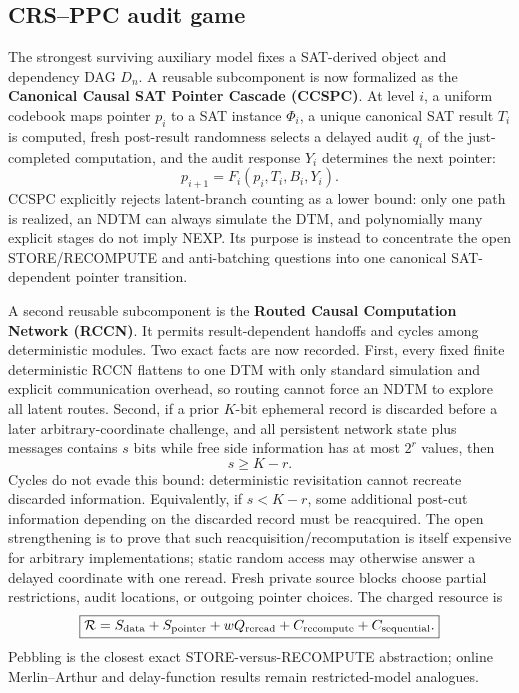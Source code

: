 \documentclass[11pt]{article}
\begin{document}
\subsection{CRS--PPC audit game}
The strongest surviving auxiliary model fixes a SAT-derived object and dependency DAG \(D_n\).
A reusable subcomponent is now formalized as the \textbf{Canonical Causal SAT Pointer Cascade
(CCSPC)}. At level \(i\), a uniform codebook maps pointer \(p_i\) to a SAT instance \(\Phi_i\),
a unique canonical SAT result \(T_i\) is computed, fresh post-result randomness selects a delayed
audit \(q_i\) of the just-completed computation, and the audit response \(Y_i\) determines the
next pointer:
\[
p_{i+1}=F_i(p_i,T_i,B_i,Y_i).
\]
CCSPC explicitly rejects latent-branch counting as a lower bound: only one path is realized, an NDTM
can always simulate the DTM, and polynomially many explicit stages do not imply NEXP. Its purpose is
instead to concentrate the open STORE/RECOMPUTE and anti-batching questions into one canonical
SAT-dependent pointer transition.

A second reusable subcomponent is the \textbf{Routed Causal Computation Network (RCCN)}. It permits
result-dependent handoffs and cycles among deterministic modules. Two exact facts are now recorded.
First, every fixed finite deterministic RCCN flattens to one DTM with only standard simulation and
explicit communication overhead, so routing cannot force an NDTM to explore all latent routes.
Second, if a prior \(K\)-bit ephemeral record is discarded before a later arbitrary-coordinate
challenge, and all persistent network state plus messages contains \(s\) bits while free side
information has at most \(2^r\) values, then
\[
\boxed{s\ge K-r.}
\]
Cycles do not evade this bound: deterministic revisitation cannot recreate discarded information.
Equivalently, if \(s<K-r\), some additional post-cut information depending on the discarded record
must be reacquired. The open strengthening is to prove that such reacquisition/recomputation is
itself expensive for arbitrary implementations; static random access may otherwise answer a delayed
coordinate with one reread.
Fresh private source blocks choose partial restrictions, audit locations, or outgoing pointer
choices. The charged resource is
\[
\boxed{\mathcal R=S_{\rm data}+S_{\rm pointer}+wQ_{\rm reread}+C_{\rm recompute}+C_{\rm sequential}.}
\]
Pebbling is the closest exact STORE-versus-RECOMPUTE abstraction; online Merlin--Arthur and
delay-function results remain restricted-model analogues.
\end{document}
